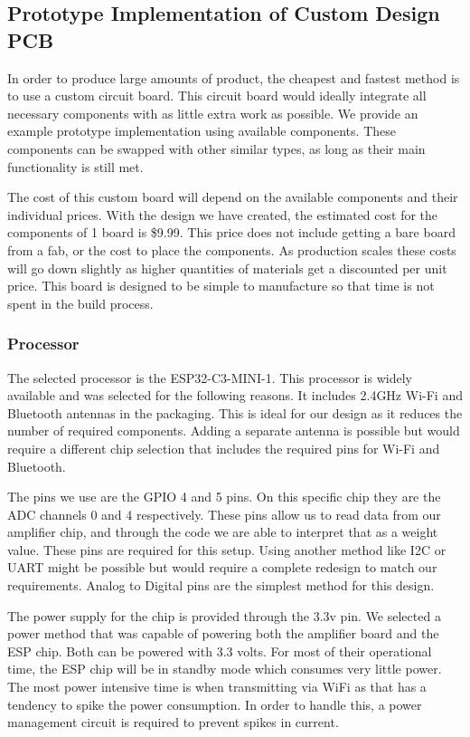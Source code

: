 \subsection{Prototype Implementation of Custom Design PCB}

In order to produce large amounts of product, the cheapest and fastest method is to use a custom circuit board. This circuit board would ideally integrate all necessary components with as little extra work as possible. We provide an example prototype implementation using available components. These components can be swapped with other similar types, as long as their main functionality is still met. 

The cost of this custom board will depend on the available components and their individual prices. With the design we have created, the estimated cost for the components of 1 board is \$9.99. This price does not include getting a bare board from a fab, or the cost to place the components. As production scales these costs will go down slightly as higher quantities of materials get a discounted per unit price. This board is designed to be simple to manufacture so that time is not spent in the build process. 

\subsubsection{Processor}

The selected processor is the ESP32-C3-MINI-1. This processor is widely available and was selected for the following reasons. It includes 2.4GHz Wi-Fi and Bluetooth antennas in the packaging. This is ideal for our design as it reduces the number of required components. Adding a separate antenna is possible but would require a different chip selection that includes the required pins for Wi-Fi and Bluetooth. 

The pins we use are the GPIO 4 and 5 pins. On this specific chip they are the ADC channels 0 and 4 respectively. These pins allow us to read data from our amplifier chip, and through the code we are able to interpret that as a weight value. These pins are required for this setup. Using another method like I2C or UART might be possible but would require a complete redesign to match our requirements. Analog to Digital pins are the simplest method for this design. 

The power supply for the chip is provided through the 3.3v pin. We selected a power method that was capable of powering both the amplifier board and the ESP chip. Both can be powered with 3.3 volts. For most of their operational time, the ESP chip will be in standby mode which consumes very little power. The most power intensive time is when transmitting via WiFi as that has a tendency to spike the power consumption. In order to handle this, a power management circuit is required to prevent spikes in current. 

